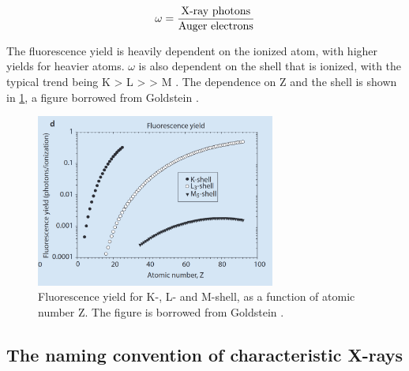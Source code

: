 \begin{equation}
    \label{eq:theory:theoreticalxray:yield}
    \omega = \frac{\textnormal{X-ray photons}}{\textnormal{Auger electrons}}
\end{equation}

The fluorescence yield is heavily dependent on the ionized atom, with higher yields for heavier atoms.
$\omega$ is also dependent on the shell that is ionized, with the typical trend being K > L > > M \cite[p. 267]{goldstein_scanning_2018}.
The dependence on Z and the shell is shown in \cref{fig:theory:fluorescence_yield}, a figure borrowed from Goldstein \cite{goldstein_scanning_2018}.

\begin{figure}[ht]
    \centering
    \includegraphics[width=0.7\textwidth]{figures/fluorescence_yield_Goldstein_Fig4-3-d.png}
    \caption{
        Fluorescence yield for K-, L- and M-shell, as a function of atomic number Z.
        The figure is borrowed from Goldstein \cite[Fig. 4.3 (d)]{goldstein_scanning_2018}.
    }
    \label{fig:theory:fluorescence_yield}
\end{figure}








\subsection{The naming convention of characteristic X-rays}
\label{theory:xray_formation:naming}


